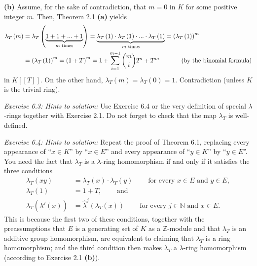 \documentclass[numbers=enddot,12pt,final,onecolumn,notitlepage]{scrartcl}%
\begin{document}
\textbf{(b)} Assume, for the sake of contradiction, that $m=0$ in $K$ for some
positive integer $m$. Then, Theorem 2.1 \textbf{(a)} yields%
\begin{align*}
\lambda_{T}\left(  m\right)   &  =\lambda_{T}\left(  \underbrace{1+1+...+1}%
_{m\text{ times}}\right)  =\underbrace{\lambda_{T}\left(  1\right)
\cdot\lambda_{T}\left(  1\right)  \cdot...\cdot\lambda_{T}\left(  1\right)
}_{m\text{ times}}=\left(  \lambda_{T}\left(  1\right)  \right)  ^{m}\\
&  =\left(  \lambda_{T}\left(  1\right)  \right)  ^{m}=\left(  1+T\right)
^{m}=1+\sum_{i=1}^{m-1}\dbinom{m}{i}T^{i}+T^{m}\ \ \ \ \ \ \ \ \ \ \left(
\text{by the binomial formula}\right)
\end{align*}
in $K\left[  \left[  T\right]  \right]  $. On the other hand, $\lambda
_{T}\left(  m\right)  =\lambda_{T}\left(  0\right)  =1.$ Contradiction (unless
$K$ is the trivial ring).

\textit{Exercise 6.3: Hints to solution:} Use Exercise 6.4 or the very
definition of special $\lambda$-rings together with Exercise 2.1. Do not
forget to check that the map $\lambda_{T}$ is well-defined.

\textit{Exercise 6.4: Hints to solution:} Repeat the proof of Theorem 6.1,
replacing every appearance of ``$x\in K$'' by ``$x\in E$'' and every
appearance of ``$y\in K$'' by ``$y\in E$''. You need the fact that
$\lambda_{T}$ is a $\lambda$-ring homomorphism if and only if it satisfies the
three conditions%
\begin{align*}
\lambda_{T}\left(  xy\right)   &  =\lambda_{T}\left(  x\right)  \widehat{\cdot
}\lambda_{T}\left(  y\right)  \ \ \ \ \ \ \ \ \ \ \text{for every }x\in
E\text{ and }y\in E,\\
\lambda_{T}\left(  1\right)   &  =1+T,\ \ \ \ \ \ \ \ \ \ \text{and}\\
\lambda_{T}\left(  \lambda^{j}\left(  x\right)  \right)   &  =\widehat{\lambda
}^{j}\left(  \lambda_{T}\left(  x\right)  \right)
\ \ \ \ \ \ \ \ \ \ \text{for every }j\in\mathbb{N}\text{ and }x\in E.
\end{align*}
This is because the first two of these conditions, together with the
preassumptions that $E$ is a generating set of $K$ as a $\mathbb{Z}$-module
and that $\lambda_{T}$ is an additive group homomorphism, are equivalent to
claiming that $\lambda_{T}$ is a ring homomorphism; and the third condition
then makes $\lambda_{T}$ a $\lambda$-ring homomorphism (according to Exercise
2.1 \textbf{(b)}).
\end{document}
